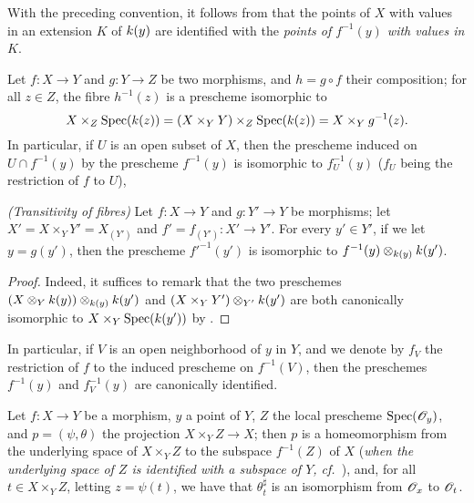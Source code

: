 With the preceding convention, it follows from  that the points of $X$ with values in an extension $K$ of $k(y)$ are identified with the \emph{points of $f^{-1}(y)$ with values in $K$}.

\begin{env}[3.6.3]
\label{I.3.6.3}
Let $f:X\to Y$ and $g:Y\to Z$ be two morphisms, and $h=g\circ f$ their composition; for all $z\in Z$, the fibre $h^{-1}(z)$ is a prescheme isomorphic to
\[
  X\times_Z\operatorname{Spec}(k(z))=(X\times_Y Y)\times_Z\operatorname{Spec}(k(z))=X\times_Y g^{-1}(z).
\]
In particular, if $U$ is an open subset of $X$, then the prescheme induced on $U\cap f^{-1}(y)$ by the prescheme $f^{-1}(y)$ is isomorphic to $f^{-1}_U(y)$ ($f_U$ being the restriction of $f$ to $U$),
\end{env}

\begin{proposition}[3.6.4]
\label{I.3.6.4}
\emph{(Transitivity of fibres)}
Let $f:X\to Y$ and $g:Y'\to Y$ be morphisms; let $X'=X\times_Y Y'=X_{(Y')}$ and $f'=f_{(Y')}:X'\to Y'$.
For every $y'\in Y'$, if we let $y=g(y')$, then the prescheme $f'^{-1}(y')$ is isomorphic to $f^{-1}(y)\otimes_{k(y)}k(y')$.
\end{proposition}

\begin{proof}
\label{proof-I.3.6.4}
Indeed, it suffices to remark that the two preschemes $(X\otimes_Yk(y))\otimes_{k(y)}k(y')$ and $(X\times_Y Y')\otimes_{Y'}k(y')$ are both canonically isomorphic to $X\times_Y\operatorname{Spec}(k(y'))$ by .
\end{proof}

In particular, if $V$ is an open neighborhood of $y$ in $Y$, and we denote by $f_V$ the restriction of $f$ to the induced prescheme on $f^{-1}(V)$, then the preschemes $f^{-1}(y)$ and $f^{-1}_V(y)$ are canonically identified.

\begin{proposition}[3.6.5]
\label{I.3.6.5}
Let $f:X\to Y$ be a morphism, $y$ a point of $Y$, $Z$ the local prescheme $\operatorname{Spec}(\mathscr{O}_y)$, and $p=(\psi,\theta)$ the projection $X\times_Y Z\to X$; then $p$ is a homeomorphism from the underlying space of $X\times_Y Z$ to the subspace $f^{-1}(Z)$ of $X$ (\emph{when the underlying space of $Z$ is identified with a subspace of $Y$, cf.~}), and, for all $t\in X\times_Y Z$, letting $z=\psi(t)$, we have that $\theta_t^\sharp$ is an isomorphism from $\mathscr{O}_x$ to $\mathscr{O}_t$.
\end{proposition}

